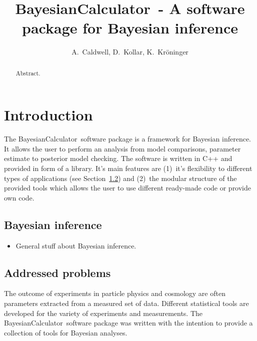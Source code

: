 \documentclass[11pt, a4paper]{article}
\newcommand{\BC}{{\sc BayesianCalculator}}
\begin{document}

\thispagestyle{empty} 

\title{\BC\ - A software package for Bayesian inference} 

\author{A.~Caldwell, D.~Kollar, K.~Kr\"oninger} 

\maketitle

\begin{abstract} 
Abstract. 
\end{abstract} 

\pagebreak 


\section{Introduction}

The \BC\ software package is a framework for Bayesian inference. It
allows the user to perform an analysis from model comparisons,
parameter estimate to posterior model checking. The software is
written in C++ and provided in form of a library. It's main features
are (1)~it's flexibility to different types of applications (see
Section~\ref{subsection:problems}) and (2)~the modular structure of
the provided tools which allows the user to use different ready-made
code or provide own code. 

\subsection{Bayesian inference} 

\begin{itemize} 
\item General stuff about Bayesian inference. 
\end{itemize} 

\subsection{Addressed problems} 
\label{subsection:problems} 

The outcome of experiments in particle physics and cosmology are often
parameters extracted from a measured set of data. Different
statistical tools are developed for the variety of experiments and
measurements. The \BC\ software package was written with the intention
to provide a collection of tools for Bayesian analyses. \\ 
\end{document}
